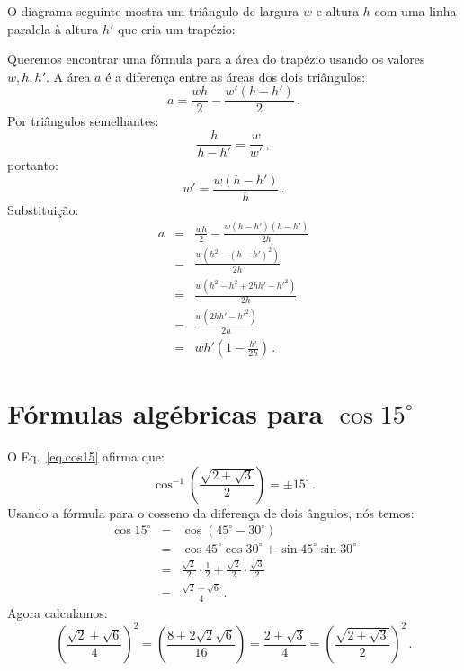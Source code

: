 O diagrama seguinte mostra um triângulo de largura $w$ e altura $h$ com uma linha paralela à altura $h'$ que cria um trapézio:

\begin{center}
\end{center}

Queremos encontrar uma fórmula para a área do trapézio usando os valores $w, h, h'$. A área $a$ é a diferença entre as áreas dos dois triângulos:
\begin{displaymath}
a = \frac{wh}{2} - \frac{w'(h-h')}{2}\,.
\end{displaymath}
Por triângulos semelhantes:
\begin{displaymath}
\frac{h}{h-h'} = \frac{w}{w'}\,,
\end{displaymath}
portanto:
\begin{displaymath}
w' = \frac{w(h-h')}{h}\,.
\end{displaymath}
Substituição:
\begin{eqnarray*}
a &=& \frac{wh}{2} - \frac{w(h-h')(h-h')}{2h}\\[8pt]
&=&\frac{w(h^2-(h-h')^2)}{2h}\\[8pt]
&=&\frac{w(h^2-h^2+2hh'-h'^2)}{2h}\\[8pt]
&=&\frac{w(2hh'-h'^2)}{2h}\\[8pt]
&=&wh'(1-\frac{h'}{2h})\,.
\end{eqnarray*}

\section{Fórmulas algébricas para $\cos 15^{\circ}$}\label{a.cosine}

O Eq.~\ref{eq.cos15} afirma que:
\[
\cos^{-1}\left(\frac{\sqrt{2+\sqrt{3}}}{2}\right) = \pm 15^{\circ}\,.
\]
Usando a fórmula para o cosseno da diferença de dois ângulos, nós temos:
\begin{eqnarray*}
\cos 15^\circ &=& \cos(45^\circ-30^\circ)\\
&=& \cos 45^\circ \cos 30^\circ + \sin 45^\circ \sin 30^\circ\\
&=&\frac{\sqrt{2}}{2}\cdot \frac{1}{2} + \frac{\sqrt{2}}{2}\cdot \frac{\sqrt{3}}{2}\\
&=&\frac{\sqrt{2}+\sqrt{6}}{4}\,.
\end{eqnarray*}
Agora calculamos:
\[
\left(\frac{\sqrt{2}+\sqrt{6}}{4}\right)^2 =
\left(\frac{8+2\sqrt{2}\sqrt{6}}{16}\right)=\frac{2+\sqrt{3}}{4}=
\left(\frac{\sqrt{2+\sqrt{3}}}{2}\right)^2\,.
\]
